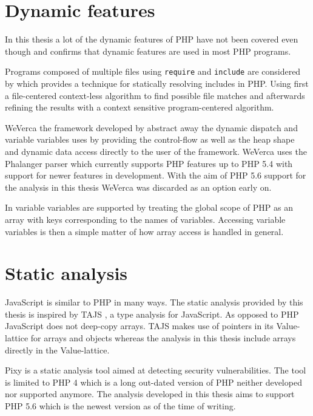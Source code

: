 \section{Dynamic features}
In this thesis a lot of the dynamic features of PHP have not been covered even though  and  confirms that dynamic features are used in most PHP programs.

Programs composed of multiple files using \texttt{require} and \texttt{include} are considered by  which provides a technique for statically resolving includes in PHP. Using first a file-centered context-less algorithm to find possible file matches and afterwards refining the results with a context sensitive program-centered algorithm.

WeVerca the framework developed by  abstract away the dynamic dispatch and variable variables uses by providing the control-flow as well as the heap shape and dynamic data access directly to the user of the framework. WeVerca uses the Phalanger parser which currently supports PHP features up to PHP 5.4 with support for newer features in development. With the aim of PHP 5.6 support for the analysis in this thesis WeVerca was discarded as an option early on.

In  variable variables are supported by treating the global scope of PHP as an array with keys corresponding to the names of variables. Accessing variable variables is then a simple matter of how array access is handled in general.

\section{Static analysis}
JavaScript is similar to PHP in many ways. The static analysis provided by this thesis is inspired by TAJS , a type analysis for JavaScript. As opposed to PHP JavaScript does not deep-copy arrays. TAJS makes use of pointers in its Value-lattice for arrays and objects whereas the analysis in this thesis include arrays directly in the Value-lattice.

Pixy  is a static analysis tool aimed at detecting security vulnerabilities. The tool is limited to PHP 4 which is a long out-dated version of PHP neither developed nor supported anymore. The analysis developed in this thesis aims to support PHP 5.6 which is the newest version as of the time of writing.


